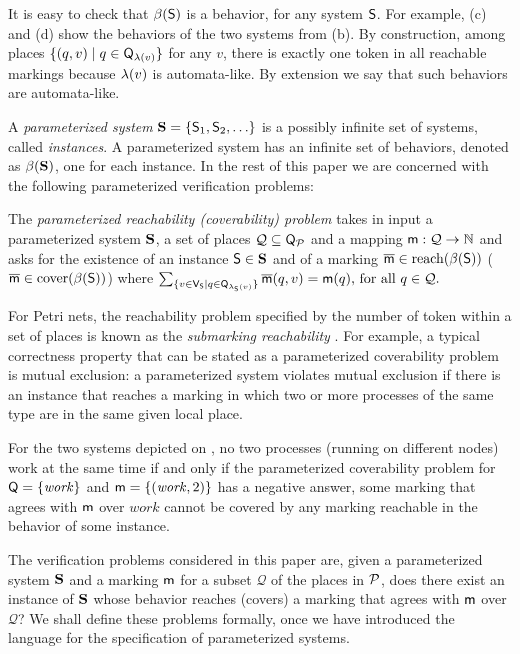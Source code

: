 It is easy to check that $\beta({\mathsf{S}})$ is a behavior, for any system
$\mathsf{S}$. For example,  (c) and (d) show the
behaviors of the two systems from  (b).  By
construction, among places ${\{ {(q, v) \mid q\in\mathsf{Q}_{\lambda(v)}} \}}$
for any $v$, there is exactly one token in all reachable markings
because $\lambda(v)$ is automata-like. By extension we say that such
behaviors are automata-like.

A \emph{parameterized system} $\mathbf{S} = {\{ {\mathsf{S}_1,\mathsf{S}_2,
  \ldots} \}}$ is a possibly infinite set of systems, called
\emph{instances}. A parameterized system has an infinite set of
behaviors, denoted as $\beta({\mathbf{S}})$, \ie one for each
instance. \ifLongVersion
In the rest of this paper we are concerned with the following
parameterized verification problems:
\begin{definition}\label{def:parameterized-verif} 
  The \emph{parameterized reachability (\resp coverability) problem}
  takes in input a parameterized system $\mathbf{S}$, a set of places $\mathcal{Q}
  \subseteq \mathsf{Q}_{\mathcal{P}}$ and a mapping 
  $\mathsf{m} : \mathcal{Q} \rightarrow \mathbb{N}$ and asks for the
  existence of an instance $\mathsf{S}\in\mathbf{S}$ and of a marking
  $\overline{\mathsf{m}} \in \mathrm{reach}({\beta({\mathsf{S}})})$ (\resp
  $\overline{\mathsf{m}} \in \mathrm{cover}({\beta({\mathsf{S}})})$) where
  \(\sum_{{\{ {v \in \mathsf{V}_{\mathsf{S}} \mid q \in \mathsf{Q}_{\lambda_{\mathsf{S}}(v)}} \}}}
  \overline{\mathsf{m}}(q,v)=\mathsf{m}(q) \text{, for all } q \in
  \mathcal{Q}.\)
\end{definition}
For Petri nets, the reachability problem specified by the number of
token within a set of places is known as the \emph{submarking
reachability} \cite{DecidabilityPetriNets}. For example, a typical
correctness property that can be stated as a parameterized
coverability problem is mutual exclusion: a parameterized system
violates mutual exclusion if there is an instance that reaches a
marking in which two or more processes of the same type are in the
same given local place.
\begin{example}
  For the two systems depicted on , no two
  processes (\ie running on different nodes) work at the same time
  if and only if the parameterized coverability problem for
  $\mathsf{Q}={\{ {\mathit{work}} \}}$ and $\mathsf{m} = {\{ {(\mathit{work},2)} \}}$
  has a negative answer, \ie some marking that agrees with $\mathsf{m}$
  over $\mathit{work}$ cannot be covered by any marking reachable in
  the behavior of some instance.
\end{example}
\else The verification problems considered in this paper are, given a
parameterized system $\mathbf{S}$ and a marking $\mathsf{m}$ for a subset
$\mathcal{Q}$ of the places in $\mathcal{P}$, does there exist an instance
of $\mathbf{S}$ whose behavior reaches (covers) a marking that agrees
with $\mathsf{m}$ over $\mathcal{Q}$? We shall define these problems
formally, once we have introduced the language for the specification
of parameterized systems. \fi

